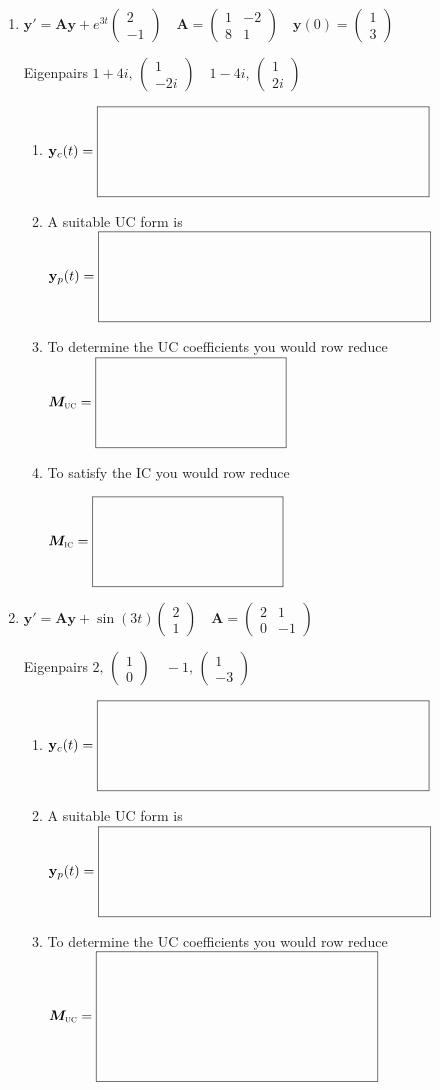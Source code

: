 \documentclass[12pt,letterpaper]{article}
\newcommand{\vect}[1]{\mathbf{#1}}
\newcommand{\mat}[1]{\bm{#1}}
\newcommand{\SystemBlank}[2]{%
  \vcenter{\hbox{$\boxed{\rule{0pt}{#2}\makebox[#1]{}}$}}}
\newcommand{\VectorBlank}{\SystemBlank{3.2in}{0.80in}}
\newcommand{\MatrixBlank}{\SystemBlank{1.8in}{0.80in}}
\begin{document}
\begin{enumerate}
\begin{enumerate}
\end{enumerate}
\newpage
\item[]
$\vect{y}'=\mat{A}\vect{y}+e^{3t}\begin{pmatrix}2\\-1\end{pmatrix}\quad
\mat{A}=\begin{pmatrix}1&-2\\8&1\end{pmatrix}\quad
\vect{y}(0)=\begin{pmatrix}1\\3\end{pmatrix}$
\par Eigenpairs $1+4i,\,\begin{pmatrix}1\\-2i\end{pmatrix}\quad
1-4i,\,\begin{pmatrix}1\\2i\end{pmatrix}$
\begin{enumerate}
\item $\vect{y}_c(t)=\VectorBlank$
\item A suitable UC form is
\newline
$\vect{y}_p(t)=\VectorBlank$
\item To determine the UC coefficients you would row reduce
\newline
$\mat{M}_{\text{\textsc{uc}}}=\MatrixBlank$
\item To satisfy the IC you would row reduce
\par\noindent $\mat{M}_{\text{\textsc{ic}}}=\MatrixBlank$\par
\end{enumerate}

\newpage
\item[]
$\vect{y}'=\mat{A}\vect{y}+\sin(3t)\begin{pmatrix}2\\1\end{pmatrix}\quad
\mat{A}=\begin{pmatrix}2&1\\0&-1\end{pmatrix}$
\par Eigenpairs $2,\,\begin{pmatrix}1\\0\end{pmatrix}\quad
-1,\,\begin{pmatrix}1\\-3\end{pmatrix}$
\begin{enumerate}
\item $\vect{y}_c(t)=\VectorBlank$
\item A suitable UC form is
\newline
$\vect{y}_p(t)=\VectorBlank$
\item To determine the UC coefficients you would row reduce
\newline
$\mat{M}_{\text{\textsc{uc}}}=\SystemBlank{2.7in}{1.20in}$
\end{enumerate}
\end{enumerate}
\end{document}
